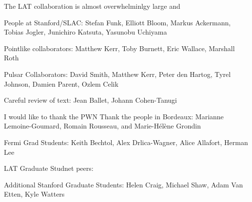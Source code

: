 

The LAT collaboration is almost overwhelminlgy large and 

People at Stanford/SLAC: Stefan Funk, Elliott Bloom, 
Markus Ackermann, Tobias Jogler, Junichiro Katsuta, Yasunobu Uchiyama

Pointlike collaborators: Matthew Kerr, Toby Burnett, Eric Wallace, Marshall Roth

Pulsar Collaborators: David Smith, Matthew Kerr, Peter den Hartog, Tyrel Johnson, Damien Parent, Ozlem Celik

Careful review of text: Jean Ballet, Johann Cohen-Tanugi

I would like to thank the PWN
Thank the people in Bordeaux: Marianne Lemoine-Goumard, Romain Rousseau, and Marie-H\'el\`ene Grondin


Fermi Grad Students: Keith Bechtol, Alex Drlica-Wagner, Alice Allafort, Herman Lee


LAT Graduate Studnet peers:

Additional Stanford Graduate Students: Helen Craig, Michael Shaw, Adam Van Etten, Kyle Watters

